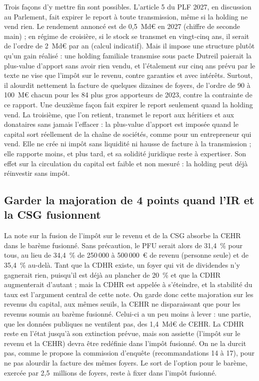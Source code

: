 \documentclass[11pt,a4paper]{article}
\begin{document}
Trois façons d'y mettre fin sont possibles. L'article 5 du PLF 2027, en discussion au Parlement, fait expirer
le report à toute transmission, même si la holding ne vend rien. Le rendement annoncé est de 0,5~Md€ en 2027
(chiffre de seconde main) ; en régime de croisière, si le stock se transmet en vingt-cinq ans, il serait de
l'ordre de 2~Md€ par an (calcul indicatif). Mais il impose une structure plutôt qu'un gain réalisé :
une holding familiale transmise sous pacte Dutreil paierait la plus-value d'apport sans avoir rien vendu, et
l'étalement sur cinq ans prévu par le texte ne vise que l'impôt sur le revenu, contre garanties et avec
intérêts. Surtout, il alourdit nettement la facture de quelques dizaines de foyers, de l'ordre de 90 à
100~M€ chacun pour les 84 plus gros apporteurs de 2023, contre la contrainte de ce rapport. Une deuxième
façon fait expirer le report seulement quand la holding vend. La troisième, que l'on retient, transmet le
report aux héritiers et aux donataires sans jamais l'effacer : la plus-value d'apport est imposée quand le
capital sort réellement de la chaîne de sociétés, comme pour un entrepreneur qui vend. Elle ne crée ni
impôt sans liquidité ni hausse de facture à la transmission ; elle rapporte moins, et plus tard, et sa
solidité juridique reste à expertiser. Son effet sur la circulation du capital est faible et non mesuré :
la holding peut déjà réinvestir sans impôt.

\subsection*{Garder la majoration de 4 points quand l'IR et la CSG fusionnent}

La note sur la fusion de l'impôt sur le revenu et de la CSG absorbe la CEHR dans le barème fusionné. Sans
précaution, le PFU serait alors de 31,4~\% pour tous, au lieu de 34,4~\% de 250\,000 à 500\,000~€ de revenu
(personne seule) et de 35,4~\% au-delà. Tant que la CDHR existe, un foyer qui vit de dividendes n'y gagnerait
rien, puisqu'il est déjà au plancher de 20~\% et que la CDHR augmenterait d'autant ; mais la CDHR est
appelée à s'éteindre, et la stabilité du taux est l'argument central de cette note. On garde donc cette
majoration sur les revenus du capital, aux mêmes seuils, la CEHR ne disparaissant que pour les revenus soumis
au barème fusionné. Celui-ci a un peu moins à lever : une partie, que les données publiques ne ventilent pas,
des 1,4~Md€ de CEHR. La CDHR reste en l'état jusqu'à son extinction prévue, mais son assiette (l'impôt sur le
revenu et la CEHR) devra être redéfinie dans l'impôt fusionné. On ne la durcit pas, comme le propose la
commission d'enquête (recommandations 14 à 17), pour ne pas alourdir la facture des mêmes foyers. Le sort de
l'option pour le barème, exercée par 2,5~millions de foyers, reste à fixer dans l'impôt fusionné.
\end{document}
